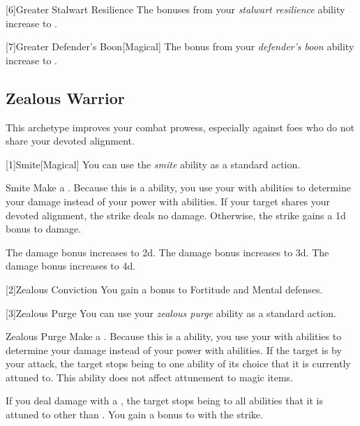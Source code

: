         [6]{Greater Stalwart Resilience} The bonuses from your \textit{stalwart resilience} ability increase to .

        [7]{Greater Defender's Boon}[Magical]
        The bonus from your \textit{defender's boon} ability increase to .

    \subsection{Zealous Warrior}
        This archetype improves your combat prowess, especially against foes who do not share your devoted alignment.

        [1]{Smite}[Magical] You can use the \textit{smite} ability as a standard action.
        \begin{freeability}{Smite}
            Make a .
            Because this is a  ability, you use your  with  abilities to determine your damage instead of your power with  abilities.
            If your target shares your devoted alignment, the strike deals no damage.
            Otherwise, the strike gains a \plus1d bonus to damage.

            \rankline
             The damage bonus increases to \plus2d.
             The damage bonus increases to \plus3d.
             The damage bonus increases to \plus4d.
        \end{freeability}

        [2]{Zealous Conviction} You gain a  bonus to Fortitude and Mental defenses.

        [3]{Zealous Purge} You can use your \textit{zealous purge} ability as a standard action.
        \begin{freeability}{Zealous Purge}
            Make a .
            Because this is a  ability, you use your  with  abilities to determine your damage instead of your power with  abilities.
            If the target is  by your attack, the target stops being  to one ability of its choice that it is currently attuned to.
            This ability does not affect attunement to magic items.

            \rankline
             If you deal damage with a , the target stops being  to all abilities that it is attuned to other than .
             You gain a  bonus to  with the strike.
        \end{freeability}

